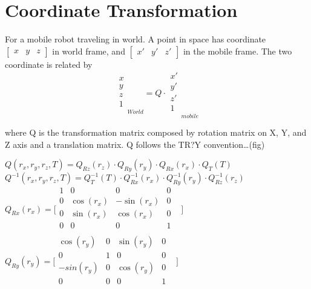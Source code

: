 \chapter{Coordinate Transformation}

For a mobile robot traveling in world. A point in space has coordinate 
$\begin{bmatrix}x & y & z\end{bmatrix}$ 
in world frame, and  
$\begin{bmatrix}x' & y' & z' \end{bmatrix}$ in the mobile frame. The
two coordinate is related by 
\begin{equation}
\begin{matrix}
x \\
y \\
z \\
1 \\
\end{matrix}_{World}=Q\cdot\begin{matrix}
x' \\
y' \\
z' \\
1  \\
\end{matrix}_{mobile}
\end{equation}


where Q is the transformation matrix composed by rotation matrix on X, 
Y, and Z axis and a translation matrix. Q follows the TR?Y 
convention\ldots (fig)

$Q(r_{x}, r_{y}, r_{z}, T)=Q_{Rz}(r_{z})\cdot Q_{Ry}(r_{y})\cdot 
Q_{Rx}(r_{x})\cdot Q_{T}(T)$\\


$Q^{-1}(r_{x}, r_{y}, r_{z}, T)=Q_{T}^{-1}(T)\cdot 
Q_{Rx}^{-1}(r_{x})\cdot Q_{Ry}^{-1}(r_{y})\cdot Q_{Rz}^{-1}(r_{z})$\\


$Q_{Rx}(r_{x})=\lbrack \begin{matrix}
1 & 0 & 0 & 0 & \\
0 & \cos (r_{x}) & -\sin (r_{x}) & 0 & \\
0 & \sin (r_{x}) & \cos (r_{x}) & 0 & \\
0 & 0 & 0 & 1 & \\
\end{matrix}
\rbrack $\\


$Q_{Ry}(r_{y})=\lbrack \begin{matrix}
\cos (r_{y}) & 0 & \sin (r_{y}) & 0 & \\
0 & 1 & 0 & 0 & \\
-sin(r_{y}) & 0 & \cos (r_{y}) & 0 & \\
0 & 0 & 0 & 1 & \\
\end{matrix}
\rbrack $\\


